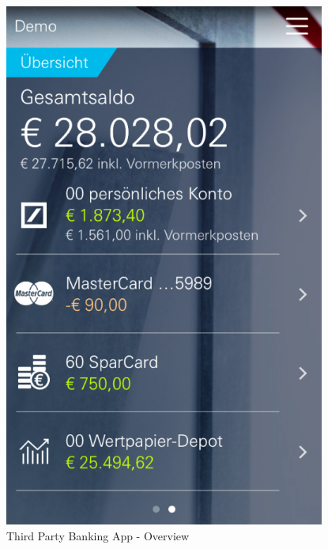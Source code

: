 \begin{figure}[H]
\begin{minipage}[b]{.5\linewidth}
        \centering\includegraphics[width=0.94\textwidth]{img/screenshots/ex4p2.png}
    \end{minipage}
	\captionsetup{labelformat=empty}
    \caption[]{Third Party Banking App - Overview}
\end{figure}
